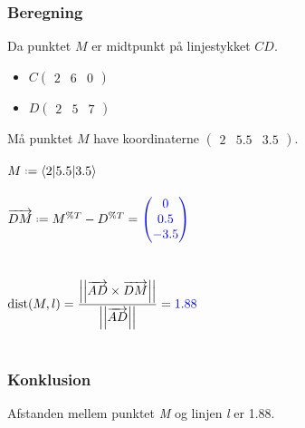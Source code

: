 \documentclass[../main.tex]{subfiles}
\begin{document}
    \subsubsection*{Beregning}
        Da punktet \(M\) er midtpunkt på linjestykket \(CD\). 
        \begin{itemize}
            \item \(C\begin{pmatrix} 2 & 6 & 0 \end{pmatrix}\)
            \item \(D\begin{pmatrix} 2 & 5 & 7 \end{pmatrix}\)
        \end{itemize}
        Må punktet \(M\) have koordinaterne \(\begin{pmatrix} 2 & 5.5 & 3.5 \end{pmatrix}\).\\\\
        \(M \defeq \langle 2{\vert 5.5\vert}3.5 \rangle\)\\\\
        \(\overrightarrow{DM} \defeq M^{\%T}-D^{\%T} = \textcolor{blue}{\begin{pmatrix} 0 \\ 0.5 \\ -3.5 \end{pmatrix}}\)\\\\\\
        \(\displaystyle \text{dist}(M, l)= \frac{\left|\left| \overrightarrow{AD} \times \overrightarrow{DM}\right|\right|}{\left|\left|\overrightarrow{AD} \right|\right|}=\textcolor{blue}{1.88}\)\\\\
    \subsubsection*{Konklusion}
    Afstanden mellem punktet \textit{M} og linjen \textit{l} er 1.88.
\end{document}
